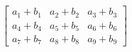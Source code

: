 \documentclass[preview]{standalone}
\begin{document}
\begin{align*}
\begin{bmatrix}a_{1} + b_{1}&  a_{2} + b_{2}&  a_{3} + b_{3}\\a_{4} + b_{4}&  a_{5} + b_{5}&  a_{6} + b_{6}\\a_{7} + b_{7}&  a_{8} + b_{8}&  a_{9} + b_{9}\end{bmatrix}
\end{align*}
\end{document}
